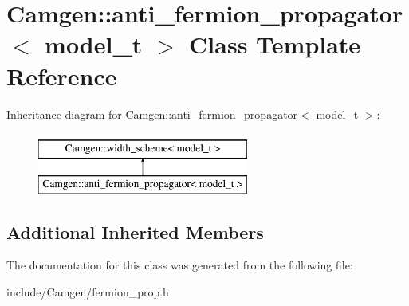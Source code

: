 \hypertarget{a00009}{}\section{Camgen\+:\+:anti\+\_\+fermion\+\_\+propagator$<$ model\+\_\+t $>$ Class Template Reference}
\label{a00009}
Inheritance diagram for Camgen\+:\+:anti\+\_\+fermion\+\_\+propagator$<$ model\+\_\+t $>$\+:\begin{figure}[H]
\begin{center}
\leavevmode
\includegraphics[height=2.000000cm]{a00009}
\end{center}
\end{figure}
\subsection*{Additional Inherited Members}


The documentation for this class was generated from the following file\+:\begin{DoxyCompactItemize}
\item 
include/\+Camgen/fermion\+\_\+prop.\+h\end{DoxyCompactItemize}
